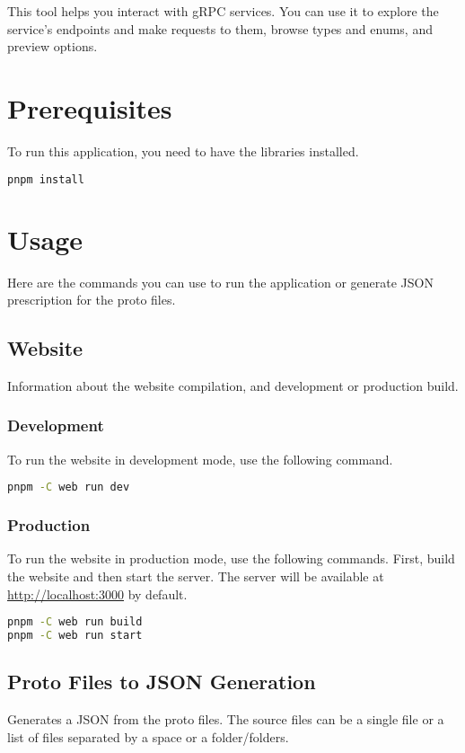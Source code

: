 This tool helps you interact with gRPC services.
You can use it to explore the service's endpoints and make requests to them, browse types and enums, and preview options.


\section{Prerequisites}
To run this application, you need to have the libraries installed.

\begin{lstlisting}[language=bash, label={lst:documentation-install}]
pnpm install
\end{lstlisting}


\section{Usage}
Here are the commands you can use to run the application or generate JSON prescription for the proto files.

\subsection{Website}
Information about the website compilation, and development or production build.

\subsubsection{Development}
To run the website in development mode, use the following command.

\begin{lstlisting}[language=bash, label={lst:documentation-web-dev}]
pnpm -C web run dev
\end{lstlisting}

\subsubsection{Production}
To run the website in production mode, use the following commands.
First, build the website and then start the server.
The server will be available at \url{http://localhost:3000} by default.

\begin{lstlisting}[language=bash, label={lst:documentation-web-build}]
pnpm -C web run build
pnpm -C web run start
\end{lstlisting}

\subsection{Proto Files to JSON Generation}
Generates a JSON from the proto files.
The source files can be a single file or a list of files separated by a space or a folder/folders.

